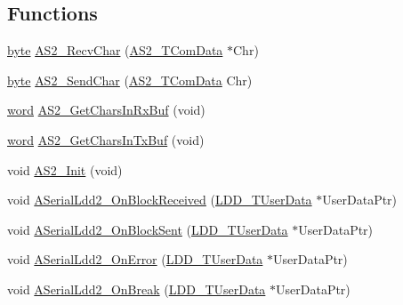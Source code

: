 \subsection*{Functions}
\begin{DoxyCompactItemize}
\item 
\hyperlink{group___p_e___types__module_ga0c8186d9b9b7880309c27230bbb5e69d}{byte} \hyperlink{group___a_s2__module_ga74c0ea40957a6853dd4b3c7228a4cc8b}{A\+S2\+\_\+\+Recv\+Char} (\hyperlink{group___a_s2__module_ga170d994b72d9b50b90572e909959cbf1}{A\+S2\+\_\+\+T\+Com\+Data} $\ast$Chr)
\item 
\hyperlink{group___p_e___types__module_ga0c8186d9b9b7880309c27230bbb5e69d}{byte} \hyperlink{group___a_s2__module_ga8db8321e87885719d7537d4c2216133d}{A\+S2\+\_\+\+Send\+Char} (\hyperlink{group___a_s2__module_ga170d994b72d9b50b90572e909959cbf1}{A\+S2\+\_\+\+T\+Com\+Data} Chr)
\item 
\hyperlink{group___p_e___types__module_ga285e72252c100e2508e4e933a0738f2b}{word} \hyperlink{group___a_s2__module_ga05edb26f39a57b4f6d7b8e168d08d544}{A\+S2\+\_\+\+Get\+Chars\+In\+Rx\+Buf} (void)
\item 
\hyperlink{group___p_e___types__module_ga285e72252c100e2508e4e933a0738f2b}{word} \hyperlink{group___a_s2__module_gabe75eb8f6eef9e5693d7b2debce2dd1f}{A\+S2\+\_\+\+Get\+Chars\+In\+Tx\+Buf} (void)
\item 
void \hyperlink{group___a_s2__module_gaa5da4b531c861ca0236bf12654a2659f}{A\+S2\+\_\+\+Init} (void)
\item 
void \hyperlink{group___a_s2__module_ga7a02cc6280b30d13707952d78f8e6c73}{A\+Serial\+Ldd2\+\_\+\+On\+Block\+Received} (\hyperlink{group___p_e___types__module_ga0b66a73f87238a782318aa0be7578e35}{L\+D\+D\+\_\+\+T\+User\+Data} $\ast$User\+Data\+Ptr)
\item 
void \hyperlink{group___a_s2__module_ga723758484ee852a66a707036a9a38a92}{A\+Serial\+Ldd2\+\_\+\+On\+Block\+Sent} (\hyperlink{group___p_e___types__module_ga0b66a73f87238a782318aa0be7578e35}{L\+D\+D\+\_\+\+T\+User\+Data} $\ast$User\+Data\+Ptr)
\item 
void \hyperlink{group___a_s2__module_ga145a063bdf852caee1c1b8adeb02fc77}{A\+Serial\+Ldd2\+\_\+\+On\+Error} (\hyperlink{group___p_e___types__module_ga0b66a73f87238a782318aa0be7578e35}{L\+D\+D\+\_\+\+T\+User\+Data} $\ast$User\+Data\+Ptr)
\item 
void \hyperlink{group___a_s2__module_ga702765a2c9f1c0e914a6ca8484088ec5}{A\+Serial\+Ldd2\+\_\+\+On\+Break} (\hyperlink{group___p_e___types__module_ga0b66a73f87238a782318aa0be7578e35}{L\+D\+D\+\_\+\+T\+User\+Data} $\ast$User\+Data\+Ptr)
\end{DoxyCompactItemize}
